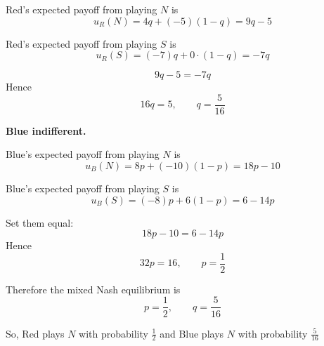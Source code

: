 \noindent Red's expected payoff from playing \(N\) is
\[
u_R(N)=4q+(-5)(1-q)=9q-5
\]

\noindent Red's expected payoff from playing \(S\) is
\[
u_R(S)=(-7)q+0\cdot(1-q)=-7q
\]

\[
9q-5=-7q
\]
Hence
\[
16q=5,
\qquad
q=\frac{5}{16}
\]

\textbf{Blue indifferent.}

Blue's expected payoff from playing \(N\) is
\[
u_B(N)=8p+(-10)(1-p)=18p-10
\]

Blue's expected payoff from playing \(S\) is
\[
u_B(S)=(-8)p+6(1-p)=6-14p
\]

Set them equal:
\[
18p-10=6-14p
\]
Hence
\[
32p=16,
\qquad
p=\frac{1}{2}
\]

Therefore the mixed Nash equilibrium is
\[
p=\frac{1}{2}, \qquad q=\frac{5}{16}
\]

So, Red plays \(N\) with probability \(\frac{1}{2}\) and Blue plays \(N\) with probability \(\frac{5}{16}\)

